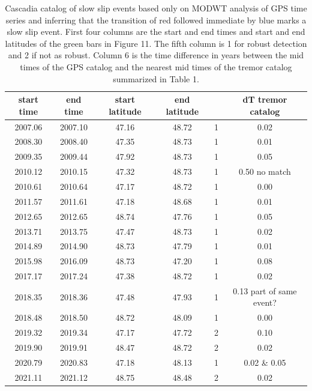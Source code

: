 \documentclass{article}
\begin{document}
 \begin{table}[hbt!]
 \caption{Cascadia catalog of slow slip events based only on MODWT analysis of GPS time series and inferring that the transition of red followed immediate by blue marks a slow slip event. First four columns are the start and end times and start and end latitudes of the green bars in Figure 11. The fifth column is 1 for robust detection and 2 if not as robust. Column 6 is the time difference in years between the mid times of the GPS catalog and the nearest mid times of the tremor catalog summarized in Table 1.}
 \centering
 \begin{tabular}{c c c c c c}
 \hline
start time & end time & start latitude & end latitude & &dT tremor catalog \\
 \hline
2007.06 & 2007.10 & 47.16 & 48.72 & 1 & 0.02 \\
2008.30 & 2008.40 & 47.35 & 48.73 & 1 & 0.01 \\
2009.35 & 2009.44 & 47.92 & 48.73 & 1 & 0.05 \\
2010.12 & 2010.15 & 47.32 & 48.73 & 1 & 0.50 no match \\
2010.61 & 2010.64 & 47.17 & 48.72 & 1 & 0.00 \\
2011.57 & 2011.61 & 47.18 & 48.68 & 1 & 0.01 \\
2012.65 & 2012.65 & 48.74 & 47.76 & 1 & 0.05 \\
2013.71 & 2013.75 & 47.47 & 48.73 & 1 & 0.02 \\
2014.89 & 2014.90 & 48.73 & 47.79 & 1 & 0.01 \\
2015.98 & 2016.09 & 48.73 & 47.20 & 1 & 0.08 \\
2017.17 & 2017.24 & 47.38 & 48.72 & 1 & 0.02 \\
2018.35 & 2018.36 & 47.48 & 47.93 & 1 & 0.13 part of same event? \\
2018.48 & 2018.50 & 48.72 & 48.09 & 1 & 0.00 \\
2019.32 & 2019.34 & 47.17 & 47.72 & 2 & 0.10 \\
2019.90 & 2019.91 & 48.47 & 48.72 & 2 & 0.02 \\
2020.79 & 2020.83 & 47.18 & 48.13 & 1 & 0.02 \& 0.05 \\
2021.11 & 2021.12 & 48.75 & 48.48 & 2 & 0.02 \\
\hline
 \end{tabular}
 \end{table}
\end{document}
